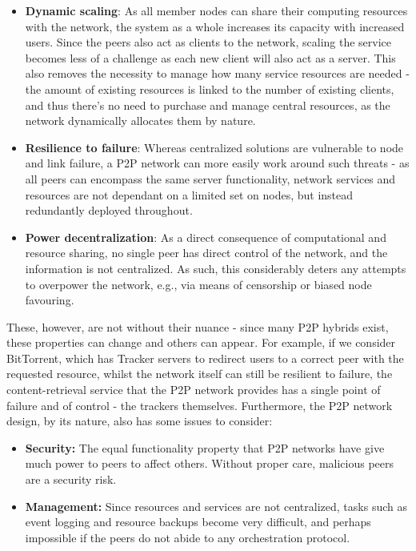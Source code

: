 \documentclass[
  oneside,
  11pt, a4paper,
  footinclude=true,
  headinclude=true,
  cleardoublepage=empty
]{scrbook}
\begin{document}
	\begin{itemize}
	    \item \textbf{Dynamic scaling}: As all member nodes can share their computing resources with the network, the system as a whole increases its capacity with increased users. Since the peers also act as clients to the network, scaling the service becomes less of a challenge as each new client will also act as a server. This also removes the necessity to manage how many service resources are needed - the amount of existing resources is linked to the number of existing clients, and thus there's no need to purchase and manage central resources, as the network dynamically allocates them by nature.
	    \item \textbf{Resilience to failure}: Whereas centralized solutions are vulnerable to node and link failure, a P2P network can more easily work around such threats - as all peers can encompass the same server functionality, network services and resources are not dependant on a limited set on nodes, but instead redundantly deployed throughout.
        \item \textbf{Power decentralization}: As a direct consequence of computational and resource sharing, no single peer has direct control of the network, and the information is not centralized. As such, this considerably deters any attempts to overpower the network, e.g., via means of censorship or biased node favouring.
	\end{itemize}
	
	These, however, are not without their nuance - since many P2P hybrids exist, these properties can change and others can appear. For example, if we consider BitTorrent, which has Tracker servers to redirect users to a correct peer with the requested resource, whilst the network itself can still be resilient to failure, the content-retrieval service that the P2P network provides has a single point of failure and of control - the trackers themselves. Furthermore, the P2P network design, by its nature, also has some issues to consider:
	
	\begin{itemize}
	    \item \textbf{Security:} The equal functionality property that P2P networks have give much power to peers to affect others. Without proper care, malicious peers are a security risk.
	    \item \textbf{Management:} Since resources and services are not centralized, tasks such as event logging and resource backups become very difficult, and perhaps impossible if the peers do not abide to any orchestration protocol.
	\end{itemize}
	
\end{document}

